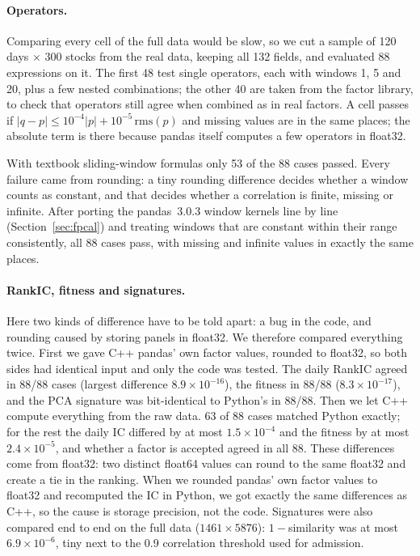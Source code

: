 \documentclass[11pt,a4paper]{article}
\begin{document}
\paragraph{Operators.} Comparing every cell of the full data would be slow, so we cut a sample of 120 days $\times$ 300 stocks from the real data, keeping all 132 fields, and evaluated 88 expressions on it. The first 48 test single operators, each with windows 1, 5 and 20, plus a few nested combinations; the other 40 are taken from the factor library, to check that operators still agree when combined as in real factors. A cell passes if $|q-p|\le 10^{-4}|p| + 10^{-5}\,\mathrm{rms}(p)$ and missing values are in the same places; the absolute term is there because pandas itself computes a few operators in float32.

With textbook sliding-window formulas only 53 of the 88 cases passed. Every failure came from rounding: a tiny rounding difference decides whether a window counts as constant, and that decides whether a correlation is finite, missing or infinite. After porting the pandas~3.0.3 window kernels line by line (Section~\ref{sec:fpcal}) and treating windows that are constant within their range consistently, all 88 cases pass, with missing and infinite values in exactly the same places.

\paragraph{RankIC, fitness and signatures.} Here two kinds of difference have to be told apart: a bug in the code, and rounding caused by storing panels in float32. We therefore compared everything twice. First we gave C++ pandas' own factor values, rounded to float32, so both sides had identical input and only the code was tested. The daily RankIC agreed in 88/88 cases (largest difference $8.9\times10^{-16}$), the fitness in 88/88 ($8.3\times10^{-17}$), and the PCA signature was bit-identical to Python's in 88/88. Then we let C++ compute everything from the raw data. 63 of 88 cases matched Python exactly; for the rest the daily IC differed by at most $1.5\times10^{-4}$ and the fitness by at most $2.4\times10^{-5}$, and whether a factor is accepted agreed in all 88. These differences come from float32: two distinct float64 values can round to the same float32 and create a tie in the ranking. When we rounded pandas' own factor values to float32 and recomputed the IC in Python, we got exactly the same differences as C++, so the cause is storage precision, not the code. Signatures were also compared end to end on the full data ($1461\times5876$): $1-$similarity was at most $6.9\times10^{-6}$, tiny next to the 0.9 correlation threshold used for admission.
\end{document}
